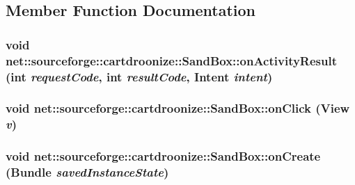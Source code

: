 \subsection{Member Function Documentation}
\hypertarget{classnet_1_1sourceforge_1_1cartdroonize_1_1SandBox_abeded53bfc61d6bb59fecf7d4a2ffbee}{
\subsubsection[{onActivityResult}]{\setlength{\rightskip}{0pt plus 5cm}void net::sourceforge::cartdroonize::SandBox::onActivityResult (int {\em requestCode}, \/  int {\em resultCode}, \/  Intent {\em intent})}}
\label{classnet_1_1sourceforge_1_1cartdroonize_1_1SandBox_abeded53bfc61d6bb59fecf7d4a2ffbee}
\hypertarget{classnet_1_1sourceforge_1_1cartdroonize_1_1SandBox_a30f8490de70a8389ce963411b36ae089}{
\subsubsection[{onClick}]{\setlength{\rightskip}{0pt plus 5cm}void net::sourceforge::cartdroonize::SandBox::onClick (View {\em v})}}
\label{classnet_1_1sourceforge_1_1cartdroonize_1_1SandBox_a30f8490de70a8389ce963411b36ae089}
\hypertarget{classnet_1_1sourceforge_1_1cartdroonize_1_1SandBox_acd23450f89c5ca9e41e47e70f111702c}{
\subsubsection[{onCreate}]{\setlength{\rightskip}{0pt plus 5cm}void net::sourceforge::cartdroonize::SandBox::onCreate (Bundle {\em savedInstanceState})}}
\label{classnet_1_1sourceforge_1_1cartdroonize_1_1SandBox_acd23450f89c5ca9e41e47e70f111702c}


